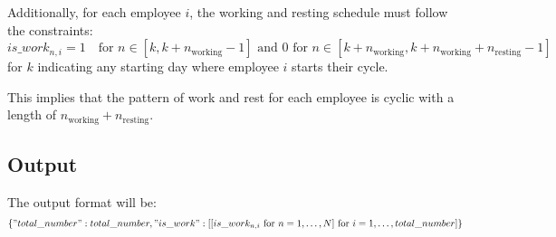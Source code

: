 \documentclass{article}
\begin{document}
Additionally, for each employee \( i \), the working and resting schedule must follow the constraints:
\[
is\_work_{n,i} = 1 \quad \text{for } n \in [k, k+n_{\text{working}} - 1] \text{ and } 0 \text{ for } n \in [k+n_{\text{working}}, k+n_{\text{working}} + n_{\text{resting}} - 1]
\]
for \( k \) indicating any starting day where employee \( i \) starts their cycle.

This implies that the pattern of work and rest for each employee is cyclic with a length of \( n_{\text{working}} + n_{\text{resting}} \).

\subsection*{Output}
The output format will be:
\[
\{ 
  "total\_number": total\_number, 
  "is\_work": [[is\_work_{n,i} \text{ for } n = 1,\ldots,N] \text{ for } i = 1,\ldots,total\_number] 
\}
\]
\end{document}
